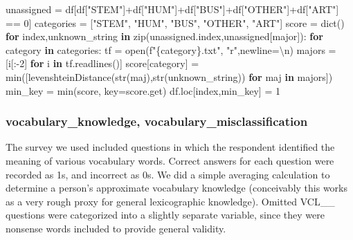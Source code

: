 \documentclass[11pt]{article}
\newenvironment{Shaded}{}{}
\newcommand{\KeywordTok}[1]{\textcolor[rgb]{0.00,0.44,0.13}{\textbf{{#1}}}}
\newcommand{\DecValTok}[1]{\textcolor[rgb]{0.25,0.63,0.44}{{#1}}}
\newcommand{\CharTok}[1]{\textcolor[rgb]{0.25,0.44,0.63}{{#1}}}
\newcommand{\StringTok}[1]{\textcolor[rgb]{0.25,0.44,0.63}{{#1}}}
\newcommand{\NormalTok}[1]{{#1}}
\newcommand{\SpecialCharTok}[1]{\textcolor[rgb]{0.25,0.44,0.63}{{#1}}}
\newcommand{\SpecialStringTok}[1]{\textcolor[rgb]{0.73,0.40,0.53}{{#1}}}
\newcommand{\ControlFlowTok}[1]{\textcolor[rgb]{0.00,0.44,0.13}{\textbf{{#1}}}}
\newcommand{\OperatorTok}[1]{\textcolor[rgb]{0.40,0.40,0.40}{{#1}}}
\newcommand{\BuiltInTok}[1]{{#1}}
\begin{document}
\begin{Shaded}
\begin{Highlighting}[]
\NormalTok{unassigned }\OperatorTok{=}\NormalTok{ df[df[}\StringTok{"STEM"}\NormalTok{]}\OperatorTok{+}\NormalTok{df[}\StringTok{"HUM"}\NormalTok{]}\OperatorTok{+}\NormalTok{df[}\StringTok{"BUS"}\NormalTok{]}\OperatorTok{+}\NormalTok{df[}\StringTok{"OTHER"}\NormalTok{]}\OperatorTok{+}\NormalTok{df[}\StringTok{"ART"}\NormalTok{] }\OperatorTok{==} \DecValTok{0}\NormalTok{]}
\NormalTok{categories }\OperatorTok{=}\NormalTok{ [}\StringTok{"STEM"}\NormalTok{, }\StringTok{"HUM"}\NormalTok{, }\StringTok{"BUS"}\NormalTok{, }\StringTok{"OTHER"}\NormalTok{, }\StringTok{"ART"}\NormalTok{]}
\NormalTok{score }\OperatorTok{=} \BuiltInTok{dict}\NormalTok{()}
\ControlFlowTok{for}\NormalTok{ index,unknown\_string }\KeywordTok{in} \BuiltInTok{zip}\NormalTok{(unassigned.index,unassigned[}\StringTok{\textquotesingle{}major\textquotesingle{}}\NormalTok{]):}
    \ControlFlowTok{for}\NormalTok{ category }\KeywordTok{in}\NormalTok{ categories:}
\NormalTok{        tf }\OperatorTok{=} \BuiltInTok{open}\NormalTok{(}\SpecialStringTok{f"}\SpecialCharTok{\{}\NormalTok{category}\SpecialCharTok{\}}\SpecialStringTok{.txt"}\NormalTok{, }\StringTok{"r"}\NormalTok{,newline}\OperatorTok{=}\StringTok{\textquotesingle{}}\CharTok{\textbackslash{}n}\StringTok{\textquotesingle{}}\NormalTok{)}
\NormalTok{        majors }\OperatorTok{=}\NormalTok{ [i[:}\OperatorTok{{-}}\DecValTok{2}\NormalTok{] }\ControlFlowTok{for}\NormalTok{ i }\KeywordTok{in}\NormalTok{ tf.readlines()]}
\NormalTok{        score[category] }\OperatorTok{=} \BuiltInTok{min}\NormalTok{([levenshteinDistance(}\BuiltInTok{str}\NormalTok{(maj),}\BuiltInTok{str}\NormalTok{(unknown\_string)) }\ControlFlowTok{for}\NormalTok{ maj }\KeywordTok{in}\NormalTok{ majors])}
\NormalTok{    min\_key }\OperatorTok{=} \BuiltInTok{min}\NormalTok{(score, key}\OperatorTok{=}\NormalTok{score.get)}
\NormalTok{    df.loc[index,min\_key] }\OperatorTok{=} \DecValTok{1}
\end{Highlighting}
\end{Shaded}

\hypertarget{vocabulary_knowledge-vocabulary_misclassification}{%
\subsubsection*{vocabulary\_knowledge,
vocabulary\_misclassification}\label{vocabulary_knowledge-vocabulary_misclassification}}

The survey we used included questions in which the respondent identified
the meaning of various vocabulary words. Correct answers for each
question were recorded as 1s, and incorrect as 0s. We did a simple
averaging calculation to determine a person's approximate vocabulary
knowledge (conceivably this works as a very rough proxy for general
lexicographic knowledge). Omitted VCL\_\_ questions were categorized
into a slightly separate variable, since they were nonsense words
included to provide general validity.
\end{document}
